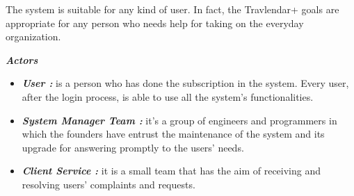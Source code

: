 The system is suitable for any kind of user. In fact, the Travlendar+ goals are appropriate for any person who needs help for taking on the everyday organization.\\
\par
\emph{\textbf{Actors}}
\begin{itemize}
	\setlength{\leftskip}{1cm}
	\item \emph{\textbf{User : }}is a person who has done the subscription in the system. Every user, after the login process, is able to use all the system’s functionalities.

	\item \emph{\textbf{System Manager Team : }}it’s a group of engineers and programmers in which the founders have entrust the maintenance of the system and its upgrade for answering promptly to the users’ needs.

	\item \emph{\textbf{Client Service : }}it is a small team that has the aim of receiving and resolving users’ complaints and requests.
\end{itemize}


